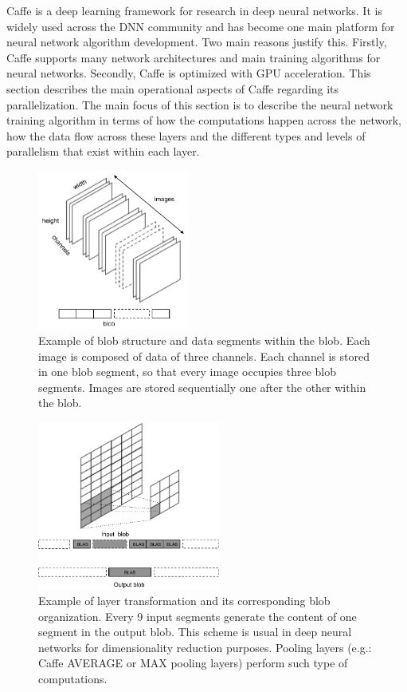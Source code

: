 Caffe is a deep learning framework for research in deep neural
networks. It is widely used across the DNN community
and has become one main platform for neural network algorithm development. 
Two main reasons justify this. Firstly, Caffe supports
many network architectures and main training algorithms for
neural networks. Secondly, Caffe is optimized with GPU acceleration.
This section describes the main operational aspects of Caffe
regarding its parallelization. 
The main focus of this section is to describe the neural network 
training algorithm in terms of how the computations happen across 
the network, how the data flow across these layers 
and the different types and levels of parallelism that exist within each layer.

\begin{figure}[]
\centering
\includegraphics[width=5cm]{figures/blob1.pdf}
\caption{Example of blob structure and data segments within the blob. Each image is composed of data of three channels. Each channel is stored in one blob segment, so that every image occupies three blob segments. Images are stored sequentially one after the other within the blob.}
\label{fig-blob}
\end{figure}
\begin{figure}[]
\centering
\includegraphics[width=6cm]{figures/blob2.pdf}
\caption{Example of layer transformation and its corresponding blob organization. Every 9 input segments generate the content of one segment in the output blob. This scheme is usual in deep neural networks for dimensionality reduction purposes. Pooling layers (e.g.: Caffe AVERAGE or MAX pooling layers) perform such type of computations.}
\label{fig-blob-trans}
\end{figure}

